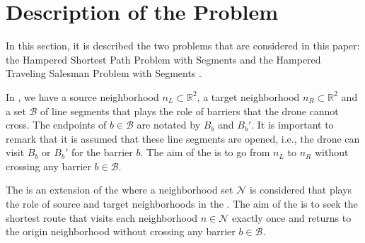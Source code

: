 \section{Description of the Problem}
In this section, it is described the two problems that are considered in this paper: the Hampered Shortest Path Problem with Segments \SPP and the Hampered Traveling Salesman Problem with Segments \TSP. 

In \SPP, we have a source neighborhood $n_L\subset\mathbb R^2$, a target neighborhood $n_R\subset\mathbb R^2$ and a set $\mathcal B$ of line segments that plays the role of barriers that the drone cannot cross. The endpoints of $b\in\mathcal B$ are notated by $B_b$ and $B_b'$. It is important to remark that it is assumed that these line segments are opened, i.e., the drone can visit $B_b$ or $B_b'$ for the barrier $b$. The aim of the \SPP is to go from $n_L$ to $n_R$ without crossing any barrier $b\in\mathcal B$.

The \TSP is an extension of the \SPP where a neighborhood set $\mathcal N$ is considered that plays the role of source and target neighborhoods in the \SPP. The aim of the \TSP is to seek the shortest route that visits each neighborhood $n\in\mathcal N$ exactly once and returns to the origin neighborhood without crossing any barrier $b\in\mathcal B$.
